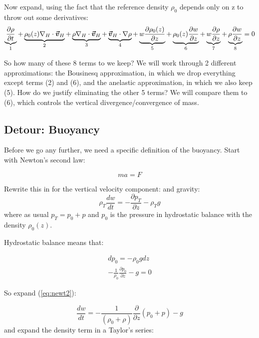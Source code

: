 \documentclass[12pt]{article}
\begin{document}
Now expand, using the fact that the reference density $\rho_0$ depends only
on z to throw out some derivatives:
\begin{equation}
\label{eq:bigone}
\underbrace{\frac{\partial \rho }{\partial t}}_1 + 
\underbrace{\rho_0(z) \nabla_H \cdot \boldsymbol{\vec{v}}_H}_2 + 
\underbrace{\rho \nabla_H \cdot \boldsymbol{\vec{v}}_H}_3 +
\underbrace{\boldsymbol{\vec{v}}_H \cdot \nabla \rho}_4 +
\underbrace{w \frac{\partial \rho_0(z) }{\partial z}}_5 +
\underbrace{\rho_0(z) \frac{\partial w }{\partial z}}_6 +
\underbrace{w \frac{\partial \rho }{\partial z}  }_7 +
\underbrace{\rho \frac{\partial w }{\partial z}}_8 = 0
 \end{equation}

So how many of these 8 terms to we keep?  
We will work through 2 different approximations:  the Bousinesq approximation,
in which we drop everything except terms (2) and (6), and the anelastic
approximation, in which we also keep (5).
How do we justify eliminating the other 5 terms?  We will compare them
to (6), which controls the vertical divergence/convergence of mass.

\subsection{Detour: Buoyancy}
\label{sec:buoyancy}

Before we go any further, we need a specific definition of the
buoyancy.  Start with Newton's second law:

\begin{equation}
  \label{eq:newton}
  m a = F
\end{equation}

Rewrite this in for  the vertical velocity component:
and gravity:
\begin{equation}
  \label{eq:newt2}
  \rho_T \frac{ dw}{dt}  = - \frac{ \partial p_T}{\partial z} - \rho_T g
\end{equation}
where as usual $p_T = p_0 + p$ and $p_0$ is the pressure in hydrostatic
balance with the density $\rho_0(z)$.

Hydrostatic balance means that:

\begin{gather}
  dp_0 = - \rho_0 g dz\\
  -\frac{ 1}{\rho_0} \frac{ \partial p_0}{\partial z} -g = 0 \label{eq:one}
\end{gather}

So expand (\ref{eq:newt2}):

\begin{equation}
  \label{eq:newt3}
   \frac{ dw}{dt}  = - \frac{1 }{(\rho_0 + \rho)} 
\frac{ \partial }{\partial z} (p_0 + p ) -  g
\end{equation}
and expand the density term in a Taylor's series:
\end{document}
